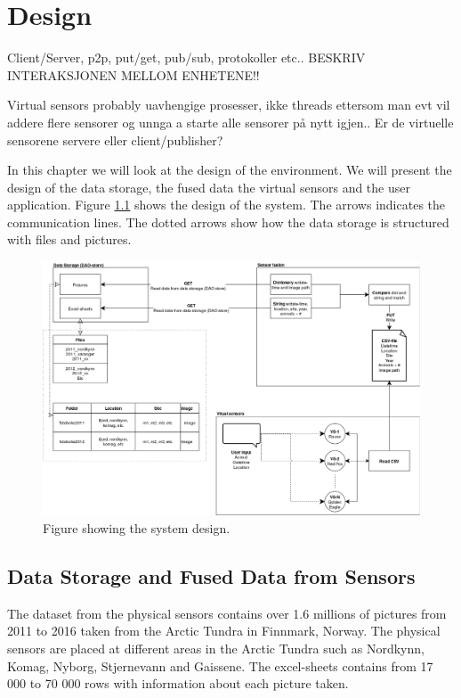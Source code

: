 \documentclass[USenglish]{uit-thesis}
\begin{document}
\chapter{Design}
Client/Server, p2p, put/get, pub/sub, protokoller etc..
BESKRIV INTERAKSJONEN MELLOM ENHETENE!!

Virtual sensors probably uavhengige prosesser, ikke threads ettersom man evt vil addere flere sensorer og unnga a starte alle sensorer på nytt igjen..
Er de virtuelle sensorene servere eller client/publisher?

In this chapter we will look at the design of the environment. We will present the design of the data storage, the fused data the virtual sensors and the user application. Figure \ref{fig:design} shows the design of the system. The arrows indicates the communication lines. The dotted arrows show how the data storage is structured with files and pictures.


\begin{figure}
\centering
\includegraphics[width=\textwidth]{Design.png}
\caption{Figure showing the system design.}
\label{fig:design}
\end{figure}

\section{Data Storage and Fused Data from Sensors}
The dataset from the physical sensors contains over 1.6 millions of pictures from 2011 to 2016 taken from the Arctic Tundra in Finnmark, Norway. The physical sensors are placed at different areas in the Arctic Tundra such as Nordkynn, Komag, Nyborg, Stjernevann and Gaissene.
The excel-sheets contains from 17 000 to 70 000 rows with information about each picture taken.
\end{document}
